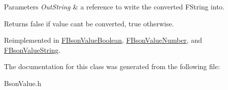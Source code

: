 \begin{DoxyParams}{Parameters}
{\em Out\+String} & a reference to write the converted F\+String into. \\
\hline
\end{DoxyParams}
\begin{DoxyReturn}{Returns}
false if value can\textquotesingle{}t be converted, true otherwise. 
\end{DoxyReturn}


Reimplemented in \mbox{\hyperlink{class_f_bson_value_boolean_ace6ca5efe35c941d7b9d9f6a9df0ef02}{F\+Bson\+Value\+Boolean}}, \mbox{\hyperlink{class_f_bson_value_number_a7a8298e9a37d8d93f5b37319665e6735}{F\+Bson\+Value\+Number}}, and \mbox{\hyperlink{class_f_bson_value_string_a531bcc8511d8de17418fd7fe6d0d797f}{F\+Bson\+Value\+String}}.



The documentation for this class was generated from the following file\+:\begin{DoxyCompactItemize}
\item 
Bson\+Value.\+h\end{DoxyCompactItemize}
